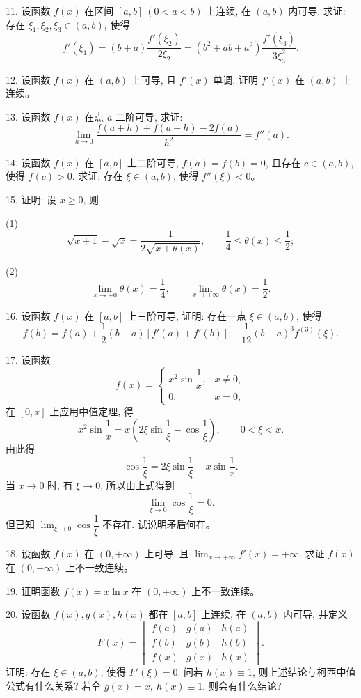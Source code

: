 \documentclass[UTF8,12pt,a4paper,fontset=fandol]{ctexart}
\begin{document}
11. 设函数 $f(x)$ 在区间 $[a,b]\ (0<a<b)$ 上连续, 在 $(a,b)$ 内可导. 求证: 存在 $\xi_1,\xi_2,\xi_3\in(a,b)$, 使得
\[
  f'(\xi_1)=(b+a)\frac{f'(\xi_2)}{2\xi_2}
  =(b^2+ab+a^2)\frac{f'(\xi_3)}{3\xi_3^2}.
\]

12. 设函数 $f(x)$ 在 $(a,b)$ 上可导, 且 $f'(x)$ 单调. 证明 $f'(x)$ 在 $(a,b)$ 上连续。

13. 设函数 $f(x)$ 在点 $a$ 二阶可导, 求证:
\[
  \lim_{h\to0}\frac{f(a+h)+f(a-h)-2f(a)}{h^2}=f''(a).
\]

14. 设函数 $f(x)$ 在 $[a,b]$ 上二阶可导, $f(a)=f(b)=0$, 且存在 $c\in(a,b)$, 使得 $f(c)>0$. 求证: 存在 $\xi\in(a,b)$, 使得 $f''(\xi)<0$。

15. 证明: 设 $x\geqslant0$, 则

(1)
\[
  \sqrt{x+1}-\sqrt x=\frac1{2\sqrt{x+\theta(x)}},\qquad
  \frac14\leqslant\theta(x)\leqslant\frac12;
\]

(2)
\[
  \lim_{x\to+0}\theta(x)=\frac14,\qquad
  \lim_{x\to+\infty}\theta(x)=\frac12.
\]

16. 设函数 $f(x)$ 在 $[a,b]$ 上三阶可导, 证明: 存在一点 $\xi\in(a,b)$, 使得
\[
  f(b)=f(a)+\frac12(b-a)[f'(a)+f'(b)]-\frac1{12}(b-a)^3f^{(3)}(\xi).
\]

17. 设函数
\[
  f(x)=
  \begin{cases}
    x^2\sin\dfrac1x, & x\ne0,\\[4pt]
    0, & x=0,
  \end{cases}
\]
在 $[0,x]$ 上应用中值定理, 得
\[
  x^2\sin\frac1x=x\left(2\xi\sin\frac1\xi-\cos\frac1\xi\right),\qquad 0<\xi<x.
\]
由此得
\[
  \cos\frac1\xi=2\xi\sin\frac1\xi-x\sin\frac1x.
\]
当 $x\to0$ 时, 有 $\xi\to0$, 所以由上式得到
\[
  \lim_{\xi\to0}\cos\frac1\xi=0.
\]
但已知 $\lim_{\xi\to0}\cos\dfrac1\xi$ 不存在. 试说明矛盾何在。

18. 设函数 $f(x)$ 在 $(0,+\infty)$ 上可导, 且 $\lim_{x\to+\infty}f'(x)=+\infty$. 求证 $f(x)$ 在 $(0,+\infty)$ 上不一致连续。

19. 证明函数 $f(x)=x\ln x$ 在 $(0,+\infty)$ 上不一致连续。

20. 设函数 $f(x),g(x),h(x)$ 都在 $[a,b]$ 上连续, 在 $(a,b)$ 内可导, 并定义
\[
  F(x)=
  \begin{vmatrix}
    f(a) & g(a) & h(a)\\
    f(b) & g(b) & h(b)\\
    f(x) & g(x) & h(x)
  \end{vmatrix}.
\]
证明: 存在 $\xi\in(a,b)$, 使得 $F'(\xi)=0$. 问若 $h(x)\equiv1$, 则上述结论与柯西中值公式有什么关系? 若令 $g(x)=x,\ h(x)\equiv1$, 则会有什么结论?
\end{document}
